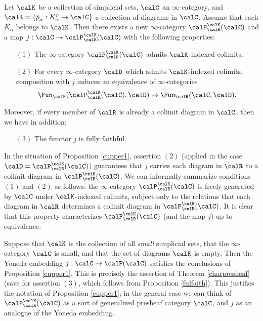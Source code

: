 \begin{proposition}\label{cupper1}
Let $\calK$ be a collection of simplicial sets, $\calC$ an $\infty$-category, and 
$\calR = \{ \overline{p}_{\alpha}: K^{\triangleright}_{\alpha} \rightarrow \calC \}$ a collection
of diagrams in $\calC$. Assume that each $K_{\alpha}$ belongs to $\calK$. Then there exists
a new $\infty$-category $\calP^{\calK}_{\calR}( \calC)$ and a map $j: \calC \rightarrow \calP^{\calK}_{\calR}(\calC)$ with the following properties:
\begin{itemize}
\item[$(1)$] The $\infty$-category $\calP^{\calK}_{\calR}(\calC)$ admits $\calK$-indexed colimits.
\item[$(2)$] For every $\infty$-category $\calD$ which admits $\calK$-indexed colimits, composition with $j$ induces an equivalence of $\infty$-categories
$$ \Fun_{\calK}( \calP^{\calK}_{\calR}(\calC), \calD) \rightarrow \Fun_{\calR}( \calC, \calD).$$
\end{itemize}
Moreover, if every member of $\calR$ is already a colimit diagram in $\calC$, then we have in addition:
\begin{itemize}
\item[$(3)$] The functor $j$ is fully faithful.
\end{itemize}
\end{proposition}

\begin{remark}
In the situation of Proposition \ref{cupper1}, assertion $(2)$ (applied in the case $\calD = \calP^{\calK}_{\calR}(\calC)$) guarantees that $j$ carries each diagram in $\calR$ to a colimit diagram in $\calP^{\calK}_{\calR}(\calC)$. We can informally summarize conditions $(1)$ and $(2)$ as follows:
the $\infty$-category $\calP^{\calK}_{\calR}(\calC)$ is freely generated by $\calC$ under $\calK$-indexed colimits, subject only to the relations that each diagram in $\calR$ determines a colimit diagram in $\calP^{\calK}_{\calR}(\calC)$. It is clear that this property characterizes $\calP^{\calK}_{\calR}(\calC)$ (and the map $j$) up to equivalence.
\end{remark}

\begin{example}
Suppose that $\calK$ is the collection of all {\em small} simplicial sets, that the $\infty$-category $\calC$ is small, and that the set of diagrams $\calR$ is empty. Then the Yoneda embedding $j: \calC \rightarrow \calP(\calC)$ satisfies the conclusions of Proposition \ref{cupper1}. This is precisely the assertion of Theorem
\ref{charpresheaf} (save for assertion $(3)$, which follows from Proposition \ref{fulfaith}). 
This justifies the notation of Proposition \ref{cupper1}; in the general case we can think of $\calP^{\calK}_{\calR}(\calC)$ as a sort of generalized presheaf category $\calC$, and $j$ as an analogue of the Yoneda embedding.
\end{example}

